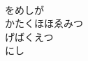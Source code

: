 \documentclass[10pt,b5j]{tarticle} %
\begin{document}
\begin{enumerate}
\begin{minipage}[c]{\blocksize}
        \vspace{\linespace}
        \item~\\
        をめしが\\
        かたくほほゑみつ\\
        げばくえつ\\
        にし
    
    \end{minipage}
\end{enumerate} %
\end{document}
